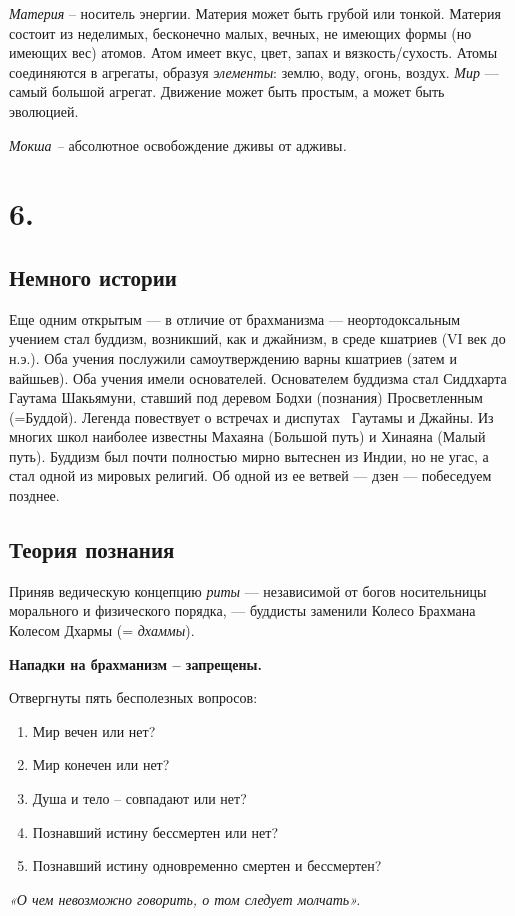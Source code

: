 \documentclass[a4paper]{article}
\newcommand\liststyleWWviiiNumvi{%
\renewcommand\theenumi{\arabic{enumi}}
\renewcommand\theenumii{\alph{enumii}}
\renewcommand\theenumiii{\roman{enumiii}}
\renewcommand\theenumiv{\arabic{enumiv}}
\renewcommand\labelenumi{\theenumi.}
\renewcommand\labelenumii{\theenumii.}
\renewcommand\labelenumiii{\theenumiii.}
\renewcommand\labelenumiv{\theenumiv.}
}
\begin{document}
{
\textit{Материя} – носитель энергии. Материя может быть грубой или тонкой. Материя состоит из неделимых, бесконечно
малых, вечных, не имеющих формы (но имеющих вес) атомов. Атом имеет вкус, цвет, запах и вязкость/сухость. Атомы
соединяются в агрегаты, образуя \textit{элементы}: землю, воду, огонь, воздух. \textit{Мир} — самый большой агрегат.
Движение может быть простым, а может быть эволюцией.}

{
\textit{Мокша – }абсолютное освобождение дживы от адживы\textit{.} }

\section{6. }
\subsection[Немного истории]{ Немного истории}
{
Еще одним открытым — в отличие от брахманизма — неортодоксальным учением стал буддизм, возникший, как и джайнизм, в
среде кшатриев (VI век до н.э.). Оба учения послужили самоутверждению варны кшатриев (затем и вайшьев). Оба учения
имели основателей. Основателем буддизма стал Сиддхарта Гаутама Шакьямуни, ставший под деревом Бодхи (познания)
Просветленным (=Буддой). Легенда повествует о встречах и диспутах \ Гаутамы и Джайны. Из многих школ наиболее известны
Махаяна (Большой путь) и Хинаяна (Малый путь). Буддизм был почти полностью мирно вытеснен из Индии, но не угас, а стал
одной из {\textquotedbl}мировых религий{\textquotedbl}. Об одной из ее ветвей — дзен — побеседуем позднее.}

\subsection[Теория познания]{ Теория познания}
{
Приняв ведическую концепцию \textit{риты} — независимой от богов носительницы морального и физического порядка, —
буддисты заменили Колесо Брахмана Колесом Дхармы (= \textit{дхаммы}). }

{\bfseries
Нападки на брахманизм – запрещены.}

{
Отвергнуты пять бесполезных вопросов:}

\liststyleWWviiiNumvi
\begin{enumerate}
\item {
Мир вечен или нет?}
\item {
Мир конечен или нет?}
\item {
Душа и тело – совпадают или нет?}
\item {
Познавший истину бессмертен или нет?}
\item {
Познавший истину одновременно смертен и бессмертен?}
\end{enumerate}
{\itshape
«О чем невозможно говорить, о том следует молчать».}
\end{document}
